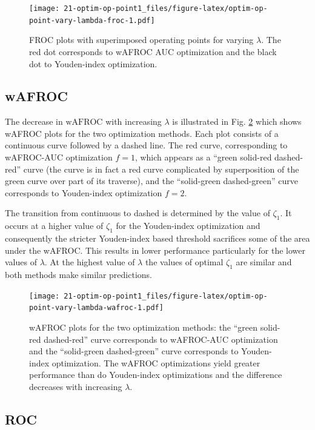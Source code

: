 \documentclass[
]{book}
\begin{document}
\begin{figure}
\centering
\texttt{[image: 21-optim-op-point1\_files/figure-latex/optim-op-point-vary-lambda-froc-1.pdf]}
\caption{\label{fig:optim-op-point-vary-lambda-froc}FROC plots with superimposed operating points for varying \(\lambda\). The red dot corresponds to wAFROC AUC optimization and the black dot to Youden-index optimization.}
\end{figure}

\hypertarget{wafroc-1}{%
\subsection{wAFROC}\label{wafroc-1}}

The decrease in \(\text{wAFROC}\) with increasing \(\lambda\) is illustrated in Fig. \ref{fig:optim-op-point-vary-lambda-wafroc} which shows wAFROC plots for the two optimization methods. Each plot consists of a continuous curve followed by a dashed line. The red curve, corresponding to wAFROC-AUC optimization \(f = 1\), which appears as a ``green solid-red dashed-red'' curve (the curve is in fact a red curve complicated by superposition of the green curve over part of its traverse), and the ``solid-green dashed-green'' curve corresponds to Youden-index optimization \(f = 2\).

The transition from continuous to dashed is determined by the value of \(\zeta_1\). It occurs at a higher value of \(\zeta_1\) for the Youden-index optimization and consequently the stricter Youden-index based threshold sacrifices some of the area under the wAFROC. This results in lower performance particularly for the lower values of \(\lambda\). At the highest value of \(\lambda\) the values of optimal \(\zeta_1\) are similar and both methods make similar predictions.

\begin{figure}
\centering
\texttt{[image: 21-optim-op-point1\_files/figure-latex/optim-op-point-vary-lambda-wafroc-1.pdf]}
\caption{\label{fig:optim-op-point-vary-lambda-wafroc}wAFROC plots for the two optimization methods: the ``green solid-red dashed-red'' curve corresponds to wAFROC-AUC optimization and the ``solid-green dashed-green'' curve corresponds to Youden-index optimization. The wAFROC optimizations yield greater performance than do Youden-index optimizations and the difference decreases with increasing \(\lambda\).}
\end{figure}

\hypertarget{roc-1}{%
\subsection{ROC}\label{roc-1}}
\end{document}

